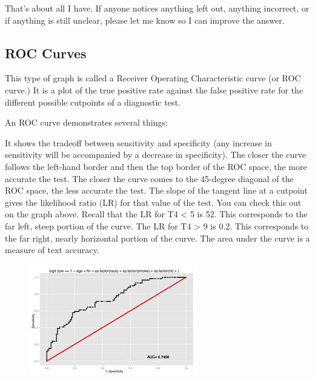 \documentclass[caret-main.tex]{subfiles}
\begin{document}
That's about all I have. If anyone notices anything left out, anything incorrect, or if anything is still unclear, please let me know so I can improve the answer.



\newpage
\subsection{ROC Curves}


This type of graph is called a Receiver Operating Characteristic curve (or ROC curve.) It is a plot of the true positive rate against the false positive rate for the different possible cutpoints of a diagnostic test.

An ROC curve demonstrates several things:

It shows the tradeoff between sensitivity and specificity (any increase in sensitivity will be accompanied by a decrease in specificity).
The closer the curve follows the left-hand border and then the top border of the ROC space, the more accurate the test.
The closer the curve comes to the 45-degree diagonal of the ROC space, the less accurate the test.
The slope of the tangent line at a cutpoint gives the likelihood ratio (LR) for that value of the test. You can check this out on the graph above. Recall that the LR for T4 < 5 is 52. This corresponds to the far left, steep portion of the curve. The LR for T4 > 9 is 0.2. This corresponds to the far right, nearly horizontal portion of the curve.
The area under the curve is a measure of text accuracy.

\newpage
\begin{figure}
\centering
\includegraphics[width=0.4\linewidth]{./ROCcurve}
\caption{}
\label{fig:ROCcurve}
\end{figure}
\end{document}
